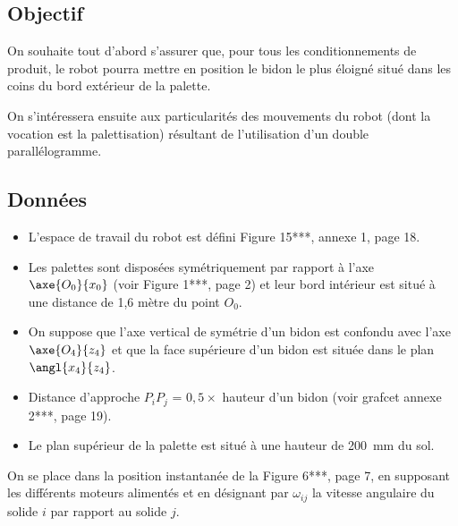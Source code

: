 {\subsection{Objectif}

On souhaite tout d’abord s’assurer que, pour tous les conditionnements de produit, le robot 
pourra mettre en position le bidon le plus éloigné situé dans les coins du bord extérieur de la 
palette. 

On s’intéressera ensuite aux particularités des mouvements du robot (dont la vocation est la 
palettisation) résultant de l’utilisation d’un double parallélogramme. 

\subsection{Données} 
\begin{itemize}
\item L’espace de travail du robot est défini Figure 15***, annexe 1, page 18. 
\item Les palettes sont disposées symétriquement par rapport à l’axe $\axe{O_0}{x_0}$ (voir Figure 1***, 
page 2) et leur bord intérieur est situé à une distance de 1,6 mètre du point $O_0$. 
\item On suppose que l’axe vertical de symétrie d’un bidon est confondu avec l’axe $\axe{O_4}{z_4}$
et que la face supérieure d’un bidon est située dans le plan $\angl{x_4}{z_4}$. 
\item Distance d’approche $P_iP_j$ = $0,5 \times$ hauteur d’un bidon (voir grafcet annexe 2***, page 19). 
\item Le plan supérieur de la palette est situé à une hauteur de \SI{200}{mm} du sol. 
\end{itemize}







On se place dans la position instantanée de la Figure 6***, page 7, en supposant les 
différents moteurs alimentés et en désignant par $\omega_{ij}$ la vitesse angulaire du solide $i$ par 
rapport au solide $j$.

}
